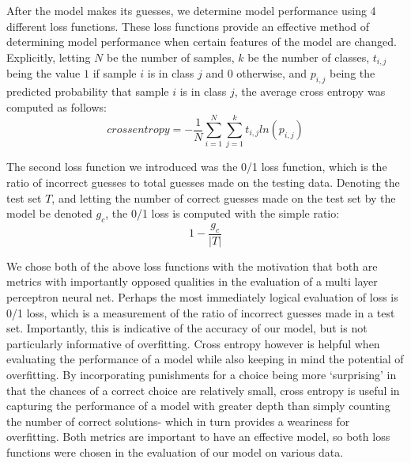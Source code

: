 \documentclass[twoside,11pt]{article}
\begin{document}
After the model makes its guesses, we determine model performance using 4 different loss functions.
These loss functions provide an effective method of determining model performance when certain features of the model are changed. Explicitly, letting
$N$ be the number of samples, $k$ be the number of classes, $t_{i,j}$ being the value $1$ if sample $i$ is in class $j$ and $0$ otherwise, and $p_{i,j}$ being the
predicted probability that sample $i$ is in class $j$, the average cross
entropy was computed as follows:
\begin{equation}
	cross entropy = -\frac{1}{N}\sum_{i=1}^{N}\sum_{j=1}^{k}t_{i,j}ln(p_{i,j})
\end{equation}

The second loss function we introduced was the 0/1 loss function, which is the ratio of incorrect guesses to total guesses made on the testing data.
Denoting the test set $T$, and letting the number of correct guesses made on the test set by the model be denoted $g_c$, the 0/1 loss is computed with the simple ratio:
\begin{equation}
	1 - \frac{g_c}{|T|}
\end{equation}

We chose both of the above loss functions with the motivation that both are metrics with importantly opposed qualities in the evaluation of a multi layer perceptron neural net. 
Perhaps the most immediately logical evaluation of loss is 0/1 loss, 
which is a measurement of the ratio of incorrect guesses made in a test set. Importantly, this is indicative of the accuracy of our model, but is not particularly informative of overfitting.
Cross entropy however is helpful when evaluating the performance of a model while also keeping in mind the potential of overfitting. By incorporating punishments for a choice being more 
`surprising' in that the chances of a correct choice are relatively small, cross entropy is useful in capturing the performance of a model with greater depth than simply counting the number of correct solutions- 
which in turn provides a weariness for overfitting.
Both metrics are important to have an effective model, so both loss functions were chosen in the evaluation of our model on various data.
\end{document}

